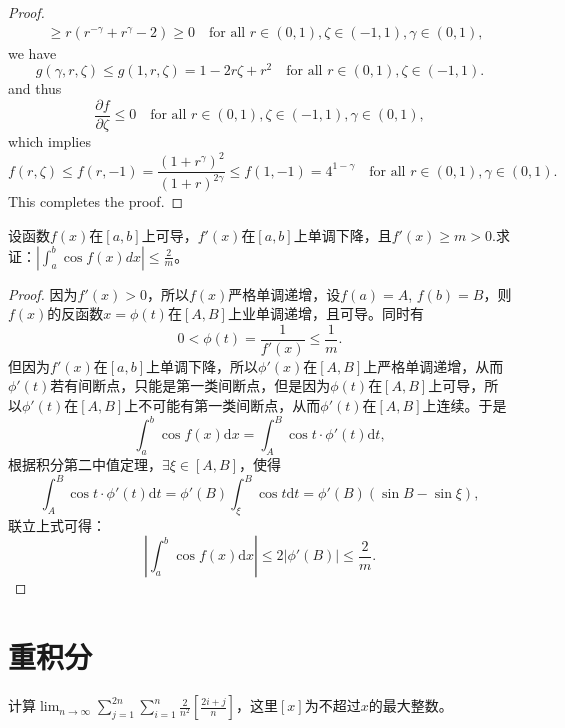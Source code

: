 \begin{proof}
\begin{align*}
    &\geq r(r^{-\gamma} + r^{\gamma} -2) 
    \geq 0 
    \quad \text{for all } r\in(0,1),\zeta\in(-1,1),\gamma\in(0,1),
  \end{align*}
  we have 
  \begin{equation*}
    g(\gamma,r,\zeta) \leq g(1,r,\zeta) = 1 - 2r\zeta + r^2 
    \quad \text{for all } r\in(0,1),\zeta\in(-1,1).
  \end{equation*}
  and thus 
  \begin{equation*}
    \frac{\partial f}{\partial \zeta} \leq 0 
    \quad \text{for all } r\in(0,1),\zeta\in(-1,1), \gamma\in(0,1),
  \end{equation*}
  which implies 
  \begin{equation*}
    f(r,\zeta) 
    \leq f(r,-1) 
    = \frac{(1+r^\gamma)^2}{(1+r)^{2\gamma}} 
    \leq f(1,-1) = 4^{1-\gamma}
    \quad \text{for all } r\in(0,1),\gamma\in(0,1).
  \end{equation*}
  This completes the proof.
\end{proof}


\begin{exercise}
设函数$f(x)$在$[a,b]$上可导，$f'(x)$在$[a,b]$上单调下降，且$f'(x)\geq m>0.$求证：$|\int_a^b\cos f(x)dx|\leq\frac 2m$。
\end{exercise}

\begin{proof}
因为$f'(x)>0$，所以$f(x)$严格单调递增，设$f(a)=A$, $f(b)=B$，则$f(x)$的反函数$x=\phi(t)$在$[A,B]$上业单调递增，且可导。同时有$$0<\phi(t)=\frac{1}{f'(x)}\leq\frac{1}{m}.$$
但因为$f'(x)$在$[a,b]$上单调下降，所以$\phi'(x)$在$[A,B]$上严格单调递增，从而$\phi'(t)$若有间断点，只能是第一类间断点，但是因为$\phi(t)$在$[A,B]$上可导，所以$\phi'(t)$在$[A,B]$上不可能有第一类间断点，从而$\phi'(t)$在$[A,B]$上连续。于是
$$\int_a^b\cos f(x)\mathrm{d}x=\int_A^B\cos t\cdot\phi'(t)\mathrm{d}t,$$
根据积分第二中值定理，$\exists\xi\in[A,B]$，使得
$$\int_A^B\cos t\cdot\phi'(t)\mathrm{d}t=\phi'(B)\int_{\xi}^B\cos t\mathrm{d}t=\phi'(B)(\sin B-\sin\xi),$$
联立上式可得：
$$|\int_a^b\cos f(x)\mathrm{d}x|\leq2|\phi'(B)|\leq\frac{2}{m}.$$
\end{proof}

  
\section{重积分}

\begin{exercise}
计算$\displaystyle\lim_{n\rightarrow\infty}\sum_{j=1}^{2n}\sum_{i=1}^n\frac2{n^2}[\frac{2i+j}n]$，这里$[x]$为不超过$x$的最大整数。%
\end{exercise}

